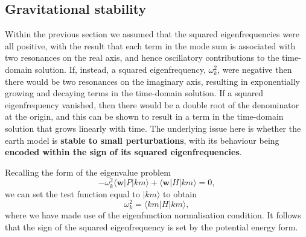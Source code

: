 \subsection*{Gravitational stability}
Within the previous section we assumed that the squared eigenfrequencies were all positive, with the result that each term in the mode sum is 
associated with two resonances on the real axis, and hence oscillatory contributions to the time-domain solution. If, instead, a squared eigenfrequency, 
$\omega_{k}^{2}$, were negative then there would be two resonances on the imaginary axis, resulting in exponentially growing and decaying terms in the 
time-domain solution. If a squared eigenfrequency vanished, then there would be a double root of the denominator at the origin, 
and this can be shown to result in a term in the time-domain solution that grows linearly with time.
The underlying issue here is whether the earth model is \textbf{stable to small perturbations}, with its behaviour being \textbf{encoded within the sign 
of its squared eigenfrequencies}.

Recalling the form of the eigenvalue problem
\begin{equation}
-\omega_{k}^{2}\langle \mathbf{w}|P|km\rangle+\langle \mathbf{w}|H|km\rangle=0,
\label{eq:37}
\end{equation}
we can set the test function equal to $|km\rangle$ to obtain
\begin{equation}
\omega_{k}^{2}=\langle km|H|km\rangle,
\label{eq:38}
\end{equation}
where we have made use of the eigenfunction normalisation condition. It follows that the sign of the squared eigenfrequency is set by the potential energy form.

